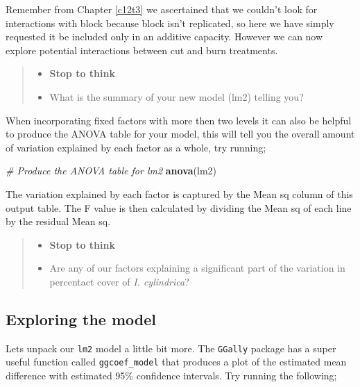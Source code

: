 \documentclass[
]{book}
\newenvironment{Shaded}{\begin{snugshade}}{\end{snugshade}}
\newcommand{\CommentTok}[1]{\textcolor[rgb]{0.56,0.35,0.01}{\textit{#1}}}
\newcommand{\FunctionTok}[1]{\textcolor[rgb]{0.13,0.29,0.53}{\textbf{#1}}}
\newcommand{\NormalTok}[1]{#1}
\providecommand{\tightlist}{%
  \setlength{\itemsep}{0pt}\setlength{\parskip}{0pt}}
\begin{document}
Remember from Chapter \ref{c12t3} we ascertained that we couldn't look for interactions with block because block isn't replicated, so here we have simply requested it be included only in an additive capacity. However we can now explore potential interactions between cut and burn treatments.

\begin{quote}
\begin{itemize}
\tightlist
\item
  \textbf{Stop to think}
\item
  What is the summary of your new model (lm2) telling you?
\end{itemize}
\end{quote}

When incorporating fixed factors with more then two levels it can also be helpful to produce the ANOVA table for your model, this will tell you the overall amount of variation explained by each factor as a whole, try running;

\begin{Shaded}
\begin{Highlighting}[]
\CommentTok{\# Produce the ANOVA table for lm2}
\FunctionTok{anova}\NormalTok{(lm2)}
\end{Highlighting}
\end{Shaded}

The variation explained by each factor is captured by the Mean sq column of this output table. The F value is then calculated by dividing the Mean sq of each line by the residual Mean sq.

\begin{quote}
\begin{itemize}
\tightlist
\item
  \textbf{Stop to think}
\item
  Are any of our factors explaining a significant part of the variation in percentact cover of \emph{I. cylindrica}?
\end{itemize}
\end{quote}

\subsection{Exploring the model}\label{exploring-the-model}

Lets unpack our \texttt{lm2} model a little bit more. The \texttt{GGally} package has a super useful function called \texttt{ggcoef\_model} that produces a plot of the estimated mean difference with estimated 95\% confidence intervals. Try running the following;
\end{document}
